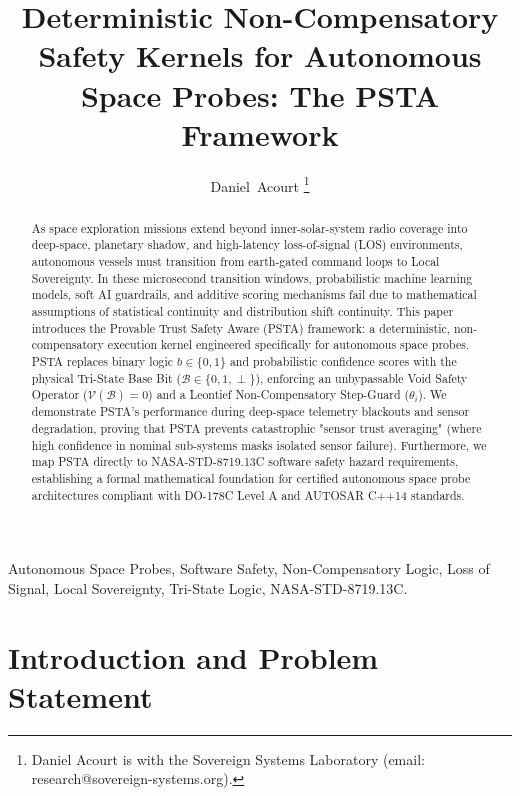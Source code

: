 \documentclass[journal]{IEEEtran}
\begin{document}
\title{Deterministic Non-Compensatory Safety Kernels for Autonomous Space Probes: The PSTA Framework}

\author{Daniel~Acourt%
\thanks{Daniel Acourt is with the Sovereign Systems Laboratory (email: research@sovereign-systems.org).}}

\maketitle

\begin{abstract}
As space exploration missions extend beyond inner-solar-system radio coverage into deep-space, planetary shadow, and high-latency loss-of-signal (LOS) environments, autonomous vessels must transition from earth-gated command loops to Local Sovereignty. In these microsecond transition windows, probabilistic machine learning models, soft AI guardrails, and additive scoring mechanisms fail due to mathematical assumptions of statistical continuity and distribution shift continuity. This paper introduces the Provable Trust Safety Aware (PSTA) framework: a deterministic, non-compensatory execution kernel engineered specifically for autonomous space probes. PSTA replaces binary logic $b \in \{0, 1\}$ and probabilistic confidence scores with the physical Tri-State Base Bit ($\mathcal{B} \in \{0, 1, \perp\}$), enforcing an unbypassable Void Safety Operator ($\mathcal{V}(\mathcal{B}) = 0$) and a Leontief Non-Compensatory Step-Guard ($\theta_i$). We demonstrate PSTA's performance during deep-space telemetry blackouts and sensor degradation, proving that PSTA prevents catastrophic "sensor trust averaging" (where high confidence in nominal sub-systems masks isolated sensor failure). Furthermore, we map PSTA directly to NASA-STD-8719.13C software safety hazard requirements, establishing a formal mathematical foundation for certified autonomous space probe architectures compliant with DO-178C Level A and AUTOSAR C++14 standards.
\end{abstract}

\begin{IEEEkeywords}
Autonomous Space Probes, Software Safety, Non-Compensatory Logic, Loss of Signal, Local Sovereignty, Tri-State Logic, NASA-STD-8719.13C.
\end{IEEEkeywords}

\section{Introduction and Problem Statement}
\end{document}
